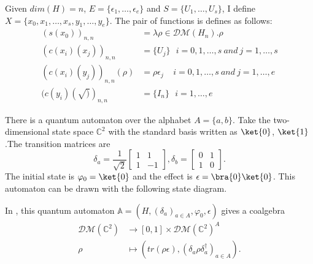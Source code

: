 \documentclass{llncs}
\newcommand{\C}{\mathbb{C}}
\newcommand{\half}{\frac{1}{\sqrt{2}}}
\begin{document}
Given $dim(H)=n$, $E=\{\epsilon_{1},\dots,\epsilon_{e}\}$ and $S=\{U_1,\dots,U_s\}$, I define $X=\{x_0,x_1,\dots,x_s,y_1,\dots,y_e\}$. The pair of functions is defines as follows:
$$
\begin{aligned}
(s(x_0))_{n,n}&=\lambda \rho\in \mathcal{DM}(H_n). \rho\\
(c(x_i)(x_j))_{n,n}&=\{U_j\}\ \ \ i=0,1,\dots,s\ and\ j=1,\dots,s\\
(c(x_i)(y_j))_{n,n}(\rho)&=\rho \epsilon_{j}\ \ \ \ \ i=0,1,\dots,s\ and\ j=1,\dots,e\\
(c(y_i)(\surd))_{n,n}&=\{I_n\}\ \ \ i=1,\dots,e
\end{aligned}
$$

\begin{example}[\cite{F12}]
There is a quantum automaton over the alphabet $A=\{a,b\}$. Take the two-dimensional state space $\C^{2}$ with the standard basis written as $\ket{0}$, $\ket{1}$.The transition matrices are
$$
\delta_a=\half\begin{bmatrix}
1&1 \\
1&-1
\end{bmatrix}, 
\delta_b=\begin{bmatrix}
0&1\\
1&0
\end{bmatrix}.
$$
The initial state is $\varphi_0=\ket{0}$ and the effect is $\epsilon=\bra{0}\ket{0}$. This automaton can be drawn with the following state diagram. 

\begin{center}
\end{center} 

In \cite{F12}, this quantum automaton $\mathbb{A}=(H,(\delta_a)_{a\in A},\varphi_0,\epsilon)$ gives a coalgebra
$$
\begin{aligned}
\mathcal{DM}(\C^2)&\rightarrow [0,1]\times \mathcal{DM}(\C^2)^{A}\\
\rho&\mapsto(tr(\rho\epsilon),(\delta_a\rho\delta_a^{\dagger})_{a\in A}).
\end{aligned}$$ 


\end{example}
\end{document}
